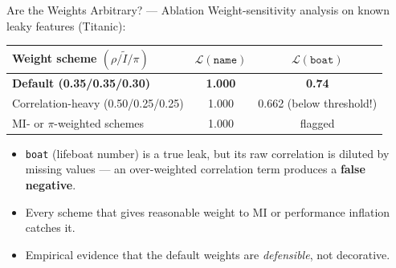 \documentclass[11pt,aspectratio=169]{beamer}
\newcommand{\cmark}{\textcolor{codegreen}{\ding{51}}}
\newcommand{\xmark}{\textcolor{red!70!black}{\ding{55}}}
\begin{document}
\begin{frame}{Are the Weights Arbitrary? --- Ablation}
  Weight-sensitivity analysis on known leaky features (Titanic):
  \vspace{0.5em}
  \begin{center}\small
  \begin{tabular}{lcc}
    \toprule
    \textbf{Weight scheme} $(\rho/\tilde{I}/\pi)$ & $\mathcal{L}(\texttt{name})$ & $\mathcal{L}(\texttt{boat})$ \\
    \midrule
    \textbf{Default (0.35/0.35/0.30)} & \textbf{1.000} & \textbf{0.74 \cmark} \\
    \rowcolor{tblAltRow}
    Correlation-heavy (0.50/0.25/0.25) & 1.000 & 0.662 \xmark\; \footnotesize(below threshold!) \\
    MI- or $\pi$-weighted schemes & 1.000 & flagged \cmark \\
    \bottomrule
  \end{tabular}
  \end{center}
  \vspace{0.8em}
  \begin{itemize}\setlength\itemsep{0.5em}
    \item \texttt{boat} (lifeboat number) is a true leak, but its raw correlation is diluted by missing values --- an over-weighted correlation term produces a \textbf{false negative}.
    \item Every scheme that gives reasonable weight to MI or performance inflation catches it.
    \item Empirical evidence that the default weights are \emph{defensible}, not decorative.
  \end{itemize}
\end{frame}
\end{document}
